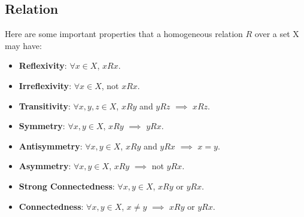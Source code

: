\documentclass{report}
\begin{document}
\subsection{Relation}
Here are some important properties that a homogeneous relation $R$ over a set X may have:
\begin{itemize}
    \item \textbf{Reflexivity}: $\forall x \in X$, $xRx$.
    \item \textbf{Irreflexivity}: $\forall x \in X$, not $xRx$.
    \item \textbf{Transitivity}: $\forall x, y, z \in X$, $xRy$ and $yRz$ $\implies$ $xRz$.
    \item \textbf{Symmetry}: $\forall x, y \in X$, $xRy$ $\implies$ $yRx$.
    \item \textbf{Antisymmetry}: $\forall x, y \in X$, $xRy$ and $yRx$ $\implies$ $x = y$.
    \item \textbf{Asymmetry}: $\forall x, y \in X$, $xRy$ $\implies$ not $yRx$.
    \item \textbf{Strong Connectedness}: $\forall x, y \in X$, $xRy$ or $yRx$.
    \item \textbf{Connectedness}: $\forall x, y \in X$, $x\ne y$ $\implies$ $xRy$ or $yRx$.
\end{itemize}
\end{document}
